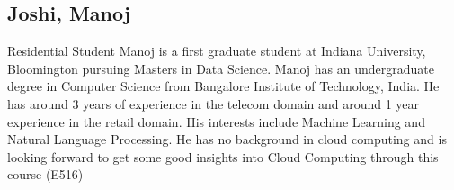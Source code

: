 \subsection{Joshi, Manoj}
Residential Student
Manoj is a first graduate student at Indiana University, Bloomington pursuing
Masters in Data Science. 
Manoj has an undergraduate degree in Computer Science from Bangalore Institute 
of Technology, India. He has around 3 years of experience in the telecom domain
and around 1 year experience in the retail domain. His interests include 
Machine Learning and Natural Language Processing. 
He has no background in cloud computing and is looking forward to get some good
insights into Cloud Computing through this course (E516)
